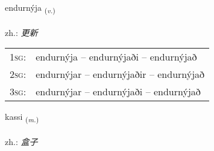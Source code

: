 \documentclass[frontgrid, backgrid]{flacards}\usepackage[]{graphicx}\usepackage[]{xcolor}
\begin{document}
\renewcommand{\flhead}{\vskip5pt \fboxsep=0pt {\small\bfseries\footnotesize Sagnorð | 动词}}
\renewcommand{\fcfoot}{\vskip5pt \fboxsep=0pt \hspace{2pt}{\small\bfseries\footnotesize 3K}}

\renewcommand{\blhead}{\vskip5pt {\small\bfseries\footnotesize Sagnorð | 动词 }}
\renewcommand{\bcfoot}{\vskip5pt \hspace{2pt}{\small\bfseries\footnotesize 3K}}


{endurnýja \small{\textsubscript{(\textit{v.})}} \\[1ex] %
\textphonetic{[ɛntʏrnija]} \\
zh.: \emph{更新} \\  [2ex]
\renewcommand*{\arraystretch}{0.8}
\begin{tabular}{p{1cm}l}
\textsc{1sg}: & endurnýja -- endurnýjaði -- endurnýjað \\ 
\textsc{2sg}: & endurnýjar -- endurnýjaðir -- endurnýjað \\ 
\textsc{3sg}: & endurnýjar -- endurnýjaði -- endurnýjað \\ 
\end{tabular}
}

\renewcommand{\flhead}{\vskip5pt \fboxsep=0pt {\small\bfseries\footnotesize Nafnorð | 名词}}
\renewcommand{\fcfoot}{\vskip5pt \fboxsep=0pt \hspace{2pt}{\small\bfseries\footnotesize 3K}}

\renewcommand{\blhead}{\vskip5pt {\small\bfseries\footnotesize Nafnorð | 名词 }}
\renewcommand{\bcfoot}{\vskip5pt \hspace{2pt}{\small\bfseries\footnotesize 3K}}


{kassi \small{\textsubscript{(\textit{m.})}} \\[1ex] %
\textphonetic{[kʰasɪ]} \\
zh.: \emph{盒子} \\  [2ex]
\renewcommand*{\arraystretch}{0.8}
}
\end{document}
